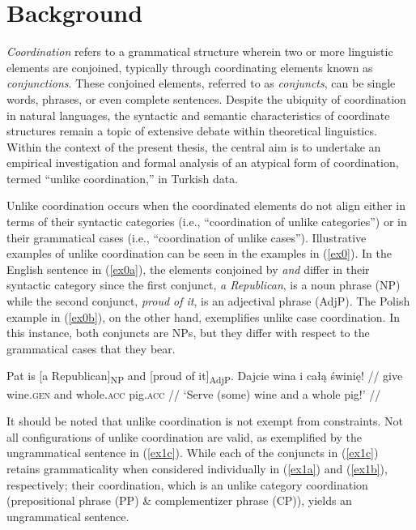 \section{Background}
\justifying

\textit{Coordination} refers to a grammatical structure wherein two or more linguistic elements are conjoined, typically through coordinating elements known as \textit{conjunctions}. These conjoined elements, referred to as \textit{conjuncts}, can be single words, phrases, or even complete sentences. Despite the ubiquity of coordination in natural languages, the syntactic and semantic characteristics of coordinate structures remain a topic of extensive debate within theoretical linguistics.
Within the context of the present thesis, the central aim is to undertake an empirical investigation and formal analysis of an atypical form of coordination, termed ``unlike coordination,'' in Turkish data. 

\begin{sloppypar}
Unlike coordination occurs when the coordinated elements do not align either in terms of their syntactic categories (i.e., ``coordination of unlike categories'') or in their grammatical cases (i.e., ``coordination of unlike cases''). Illustrative examples of unlike coordination can be seen in the examples in (\ref{ex0}). In the English sentence in (\ref{ex0a}), the elements conjoined by \textit{and} differ in their syntactic category since the first conjunct, \textit{a Republican}, is a noun phrase (NP) while the second conjunct, \textit{proud of it}, is an adjectival phrase (AdjP). The Polish example in (\ref{ex0b}), on the other hand, exemplifies unlike case coordination. In this instance, both conjuncts are NPs, but they differ with respect to the grammatical cases that they bear.
\end{sloppypar}

\pex[glspace=!1em,everygla={},everyglb={},aboveglbskip=-.15ex, interpartskip=15pt]
\label{ex0}
\a\label{ex0a}Pat is [a Republican]\textsubscript{NP} and [proud of it]\textsubscript{AdjP}. 
\a\label{ex0b} \begingl
\gla Dajcie wina i ca\l{}\k{a} \'swini\k{e}!  //
\glb give wine.\textsc{gen} and whole.\textsc{acc} pig.\textsc{acc} //
\glft `Serve (some) wine and a whole pig!'  //
\endgl
\xe

It should be noted that unlike coordination is not exempt from constraints. Not all configurations of unlike coordination are valid, as exemplified by the ungrammatical sentence in (\ref{ex1c}). While each of the conjuncts in (\ref{ex1c}) retains grammaticality when considered individually in (\ref{ex1a}) and (\ref{ex1b}), respectively; their coordination, which is an unlike category coordination (prepositional phrase (PP) \& complementizer phrase (CP)), yields an ungrammatical sentence. 

